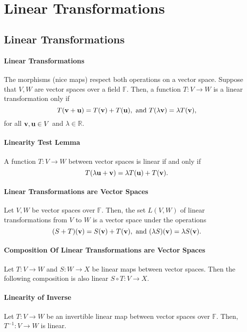 
\section{Linear Transformations}

\subsection{Linear Transformations}

\paragraph{Linear Transformations}
The morphisms (nice maps) respect both operations on a vector space.
Suppose that \(V, W\) are vector spaces over a field \(\mathbb{F}\).
Then, a function \(T: V\to W\) is a linear transformation only if
\[
    T(\mathbf{v} + \mathbf{u})  = T(\mathbf{v}) + T(\mathbf{u}),
    \text{ and }
    T(\lambda \mathbf{v}) = \lambda T(\mathbf{v}),
\] for all \(\mathbf{v}, \mathbf{u} \in V\) and \(\lambda \in \mathbb{R}\).

\paragraph{Linearity Test Lemma}
A function \(T: V \to W\) between vector spaces is linear if and only if
\[
    T(\lambda \mathbf{u} + \mathbf{v}) = \lambda T(\mathbf{u}) + T(\mathbf{v}).
\]

\paragraph{Linear Transformations are Vector Spaces}
Let \(V, W\) be vector spaces over \(\mathbb{F}\).
Then, the set \(L(V, W)\) of linear transformations from
\(V\) to \(W\) is a vector space under the operations
\[
    (S + T)(\mathbf{v}) = S(\mathbf{v}) + T(\mathbf{v}),
    \text{ and }
    (\lambda S)(\mathbf{v}) = \lambda S(\mathbf{v}).
\]

\paragraph{Composition Of Linear Transformations are Vector Spaces}
Let \(T: V\to W\) and \(S: W\to X\) be linear maps between vector spaces.
Then the following composition is also linear \(S\circ T : V\to X\).

\paragraph{Linearity of Inverse}
Let \(T: V \to W\) be an invertible linear map between vector spaces over
\(\mathbb{F}\).
Then, \(T^{-1}: V \to W\) is linear.

